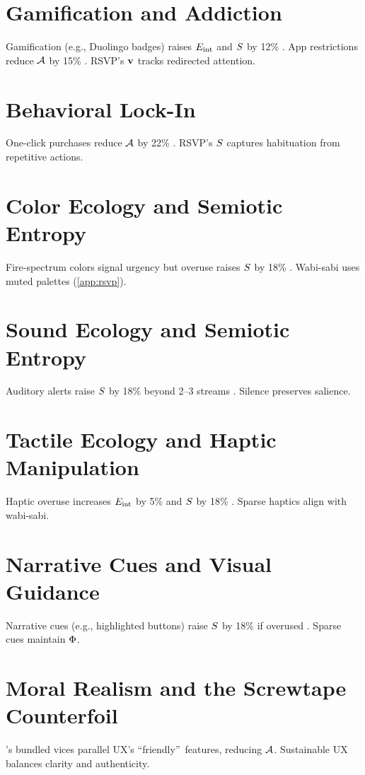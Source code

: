 \section{Gamification and Addiction}
\label{sec:aesthetic-gamification}
Gamification (e.g., Duolingo badges) raises \(E_{\mathrm{int}}\) and \(S\) by 12\% \citep{colak2024}. App restrictions reduce \(\mathcal{A}\) by 15\% \citep{doctorow2022}. RSVP’s \(\mathbf{v}\) tracks redirected attention.

\section{Behavioral Lock-In}
\label{sec:aesthetic-lockin}
One-click purchases reduce \(\mathcal{A}\) by 22\% \citep{doctorow2022}. RSVP’s \(S\) captures habituation from repetitive actions.

\section{Color Ecology and Semiotic Entropy}
\label{sec:color-ecology}
Fire-spectrum colors signal urgency but overuse raises \(S\) by 18\% \citep{hurvich1981,kaufman1949}. Wabi-sabi uses muted palettes (\cref{app:rsvp}).

\section{Sound Ecology and Semiotic Entropy}
\label{sec:sound-ecology}
Auditory alerts raise \(S\) by 18\% beyond 2--3 streams \citep{bregman1990,colak2024}. Silence preserves salience.

\section{Tactile Ecology and Haptic Manipulation}
\label{sec:tactile-ecology}
Haptic overuse increases \(E_{\mathrm{int}}\) by 5\% and \(S\) by 18\% \citep{gallace2006}. Sparse haptics align with wabi-sabi.

\section{Narrative Cues and Visual Guidance}
\label{sec:narrative-cues}
Narrative cues (e.g., highlighted buttons) raise \(S\) by 18\% if overused \citep{lewis1942}. Sparse cues maintain \(\Phi\).

\section{Moral Realism and the Screwtape Counterfoil}
\label{sec:screwtape}
\citet{lewis1942}’s bundled vices parallel UX’s \textquotedblleft friendly\textquotedblright\ features, reducing \(\mathcal{A}\). Sustainable UX balances clarity and authenticity.

